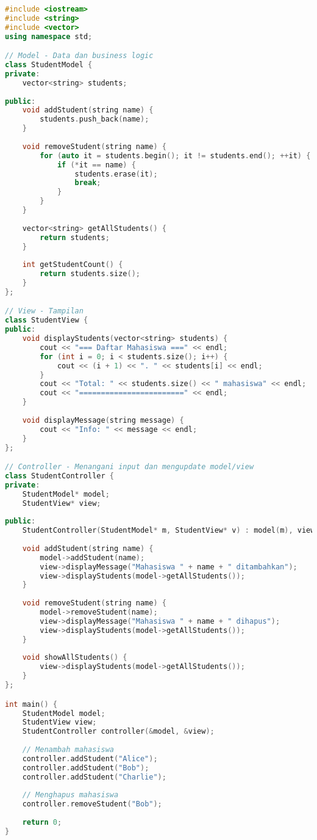 \begin{lstlisting}[language=c++, caption=MVC Pattern Implementation]
#include <iostream>
#include <string>
#include <vector>
using namespace std;

// Model - Data dan business logic
class StudentModel {
private:
    vector<string> students;
    
public:
    void addStudent(string name) {
        students.push_back(name);
    }
    
    void removeStudent(string name) {
        for (auto it = students.begin(); it != students.end(); ++it) {
            if (*it == name) {
                students.erase(it);
                break;
            }
        }
    }
    
    vector<string> getAllStudents() {
        return students;
    }
    
    int getStudentCount() {
        return students.size();
    }
};

// View - Tampilan
class StudentView {
public:
    void displayStudents(vector<string> students) {
        cout << "=== Daftar Mahasiswa ===" << endl;
        for (int i = 0; i < students.size(); i++) {
            cout << (i + 1) << ". " << students[i] << endl;
        }
        cout << "Total: " << students.size() << " mahasiswa" << endl;
        cout << "========================" << endl;
    }
    
    void displayMessage(string message) {
        cout << "Info: " << message << endl;
    }
};

// Controller - Menangani input dan mengupdate model/view
class StudentController {
private:
    StudentModel* model;
    StudentView* view;
    
public:
    StudentController(StudentModel* m, StudentView* v) : model(m), view(v) {}
    
    void addStudent(string name) {
        model->addStudent(name);
        view->displayMessage("Mahasiswa " + name + " ditambahkan");
        view->displayStudents(model->getAllStudents());
    }
    
    void removeStudent(string name) {
        model->removeStudent(name);
        view->displayMessage("Mahasiswa " + name + " dihapus");
        view->displayStudents(model->getAllStudents());
    }
    
    void showAllStudents() {
        view->displayStudents(model->getAllStudents());
    }
};

int main() {
    StudentModel model;
    StudentView view;
    StudentController controller(&model, &view);
    
    // Menambah mahasiswa
    controller.addStudent("Alice");
    controller.addStudent("Bob");
    controller.addStudent("Charlie");
    
    // Menghapus mahasiswa
    controller.removeStudent("Bob");
    
    return 0;
}
\end{lstlisting}

